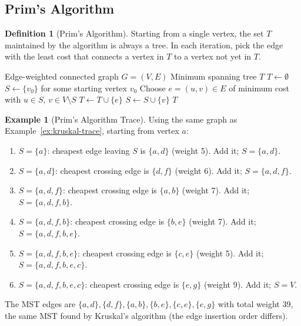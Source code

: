 \documentclass[11pt, a4paper, notitlepage]{report}
\theoremstyle{definition}
\newtheorem{definition}[theorem]{Definition}
\newtheorem{example}[theorem]{Example}
\theoremstyle{remark}
\begin{document}
\subsection{Prim's Algorithm}
\label{subsec:prim}

\begin{definition}[Prim's Algorithm]
\label{def:prim}
Starting from a single vertex, the set $T$ maintained by the algorithm is always a tree. In each iteration, pick the edge with the least cost that connects a vertex in $T$ to a vertex not yet in $T$.
\end{definition}

\begin{algorithm}[H]
\caption{Prim's Algorithm}
\label{alg:prim}
\begin{algorithmic}[1]
\Require Edge-weighted connected graph $G = (V, E)$
\Ensure Minimum spanning tree $T$
\State $T \gets \emptyset$
\State $S \gets \{v_0\}$ for some starting vertex $v_0$
  \State Choose $e = (u,v) \in E$ of minimum cost with $u \in S$, $v \in V \setminus S$
  \State $T \gets T \cup \{e\}$
  \State $S \gets S \cup \{v\}$
\EndWhile
\State \Return $T$
\end{algorithmic}
\end{algorithm}

\begin{example}[Prim's Algorithm Trace]
\label{ex:prim-trace}
Using the same graph as Example~\ref{ex:kruskal-trace}, starting from vertex $a$:
\begin{enumerate}
  \item $S = \{a\}$: cheapest edge leaving $S$ is $\{a,d\}$ (weight 5). Add it; $S = \{a,d\}$.
  \item $S = \{a,d\}$: cheapest crossing edge is $\{d,f\}$ (weight 6). Add it; $S = \{a,d,f\}$.
  \item $S = \{a,d,f\}$: cheapest crossing edge is $\{a,b\}$ (weight 7). Add it; $S = \{a,d,f,b\}$.
  \item $S = \{a,d,f,b\}$: cheapest crossing edge is $\{b,e\}$ (weight 7). Add it; $S = \{a,d,f,b,e\}$.
  \item $S = \{a,d,f,b,e\}$: cheapest crossing edge is $\{c,e\}$ (weight 5). Add it; $S = \{a,d,f,b,e,c\}$.
  \item $S = \{a,d,f,b,e,c\}$: cheapest crossing edge is $\{e,g\}$ (weight 9). Add it; $S = V$.
\end{enumerate}
The MST edges are $\{a,d\}, \{d,f\}, \{a,b\}, \{b,e\}, \{c,e\}, \{e,g\}$ with total weight 39, the same MST found by Kruskal's algorithm (the edge insertion order differs).
\end{example}
\end{document}
